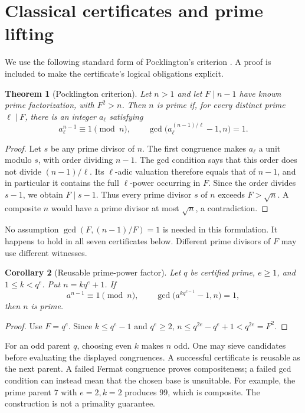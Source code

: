 \documentclass[11pt,a4paper]{article}
\newtheorem{theorem}{Theorem}[section]
\newtheorem{corollary}[theorem]{Corollary}
\theoremstyle{definition}
\begin{document}
\section{Classical certificates and prime lifting}
\label{sec:pocklington}

We use the following standard form of Pocklington's criterion
\cite{pocklington,bls}. A proof is included to make the certificate's logical
obligations explicit.

\begin{theorem}[Pocklington criterion]\label{thm:pocklington}
Let $n>1$ and let $F\mid n-1$ have known prime factorization, with
$F^2>n$. Then $n$ is prime if, for every distinct prime $\ell\mid F$,
there is an integer $a_\ell$ satisfying
\begin{equation}\label{eq:pockchecks}
 a_\ell^{n-1}\equiv1\pmod n,
 \qquad
 \gcd\bigl(a_\ell^{(n-1)/\ell}-1,n\bigr)=1.
\end{equation}
\end{theorem}

\begin{proof}
Let $s$ be any prime divisor of $n$. The first congruence makes $a_\ell$
a unit modulo $s$, with order dividing $n-1$. The gcd condition says that
this order does not divide $(n-1)/\ell$. Its $\ell$-adic valuation therefore
equals that of $n-1$, and in particular it contains the full $\ell$-power
occurring in $F$. Since the order divides $s-1$, we obtain $F\mid s-1$.
Thus every prime divisor $s$ of $n$ exceeds $F>\sqrt n$. A composite $n$
would have a prime divisor at most $\sqrt n$, a contradiction.
\end{proof}

No assumption $\gcd(F,(n-1)/F)=1$ is needed in this formulation. It happens
to hold in all seven certificates below. Different prime divisors of $F$
may use different witnesses.

\begin{corollary}[Reusable prime-power factor]\label{cor:lift}
Let $q$ be certified prime, $e\ge1$, and $1\le k<q^e$. Put
$n=kq^e+1$. If
\[
 a^{n-1}\equiv1\pmod n,
 \qquad \gcd\bigl(a^{kq^{e-1}}-1,n\bigr)=1,
\]
then $n$ is prime.
\end{corollary}

\begin{proof}
Use $F=q^e$. Since $k\le q^e-1$ and $q^e\ge2$,
$n\le q^{2e}-q^e+1<q^{2e}=F^2$.
\end{proof}

For an odd parent $q$, choosing even $k$ makes $n$ odd. One may sieve
candidates before evaluating the displayed congruences. A successful
certificate is reusable as the next parent. A failed Fermat congruence
proves compositeness; a failed gcd condition can instead mean that the
chosen base is unsuitable. For example, the prime parent $7$ with $e=2,k=2$ produces
$99$, which is composite. The construction is not a primality guarantee.
\end{document}
